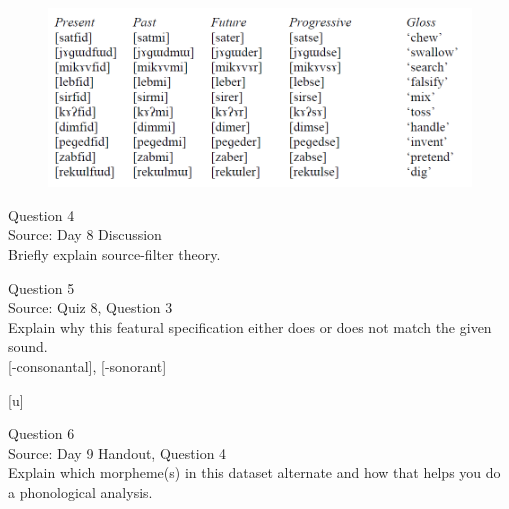 \documentclass[12pt]{article}
\begin{document}
\begin{figure}[H]
\includegraphics{../images/final_dataset.png}
\end{figure}

\newpage

{\large Question 4}\\

Source: Day 8 Discussion\\

Briefly explain source-filter theory.\\


\newpage

{\large Question 5}\\

Source: Quiz 8, Question 3\\

Explain why this featural specification either does or does not match the given sound.\\

{[-consonantal]}, {[-sonorant]}

{[u]}


\newpage

{\large Question 6}\\

Source: Day 9 Handout, Question 4\\

Explain which morpheme(s) in this dataset alternate and how that helps you do a phonological analysis.\\
\end{document}
